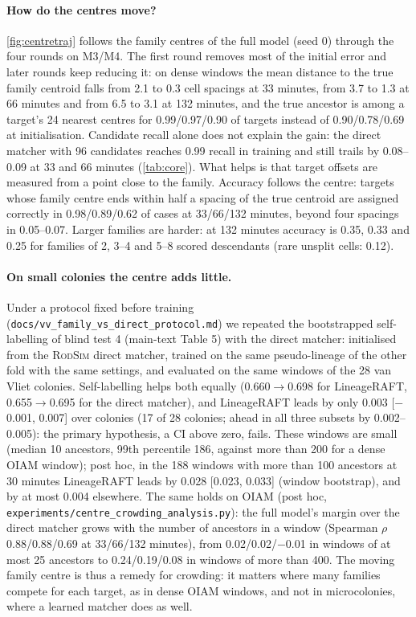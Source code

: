 \documentclass[10pt,twocolumn,letterpaper]{article}
\newcommand{\ours}{LineageRAFT\xspace}
\newcommand{\rodsim}{\textsc{RodSim}\xspace}
\begin{document}
\paragraph{How do the centres move?}
\cref{fig:centretraj} follows the family centres of the full model (seed 0) through the four rounds on M3/M4.
The first round removes most of the initial error and later rounds keep reducing it: on dense windows the mean distance to the true family centroid falls from 2.1 to 0.3 cell spacings at 33 minutes, from 3.7 to 1.3 at 66 minutes and from 6.5 to 3.1 at 132 minutes, and the true ancestor is among a target's 24 nearest centres for 0.99/0.97/0.90 of targets instead of 0.90/0.78/0.69 at initialisation.
Candidate recall alone does not explain the gain: the direct matcher with 96 candidates reaches 0.99 recall in training and still trails by 0.08--0.09 at 33 and 66 minutes (\cref{tab:core}). What helps is that target offsets are measured from a point close to the family.
Accuracy follows the centre: targets whose family centre ends within half a spacing of the true centroid are assigned correctly in 0.98/0.89/0.62 of cases at 33/66/132 minutes, beyond four spacings in 0.05--0.07. Larger families are harder: at 132 minutes accuracy is 0.35, 0.33 and 0.25 for families of 2, 3--4 and 5--8 scored descendants (rare unsplit cells: 0.12).
\paragraph{On small colonies the centre adds little.}
Under a protocol fixed before training (\texttt{docs/vv\_family\_vs\_direct\_protocol.md}) we repeated the bootstrapped self-labelling of blind test 4 (main-text Table 5) with the direct matcher: initialised from the \rodsim direct matcher, trained on the same pseudo-lineage of the other fold with the same settings, and evaluated on the same windows of the 28 van Vliet colonies.
Self-labelling helps both equally (0.660$\to$0.698 for \ours, 0.655$\to$0.695 for the direct matcher), and \ours leads by only 0.003 [$-$0.001, 0.007] over colonies (17 of 28 colonies; ahead in all three subsets by 0.002--0.005): the primary hypothesis, a CI above zero, fails.
These windows are small (median 10 ancestors, 99th percentile 186, against more than 200 for a dense OIAM window); post hoc, in the 188 windows with more than 100 ancestors at 30 minutes \ours leads by 0.028 [0.023, 0.033] (window bootstrap), and by at most 0.004 elsewhere.
The same holds on OIAM (post hoc, \texttt{experiments/centre\_crowding\_analysis.py}): the full model's margin over the direct matcher grows with the number of ancestors in a window (Spearman $\rho$ 0.88/0.88/0.69 at 33/66/132 minutes), from 0.02/0.02/$-$0.01 in windows of at most 25 ancestors to 0.24/0.19/0.08 in windows of more than 400.
The moving family centre is thus a remedy for crowding: it matters where many families compete for each target, as in dense OIAM windows, and not in microcolonies, where a learned matcher does as well.
\end{document}
